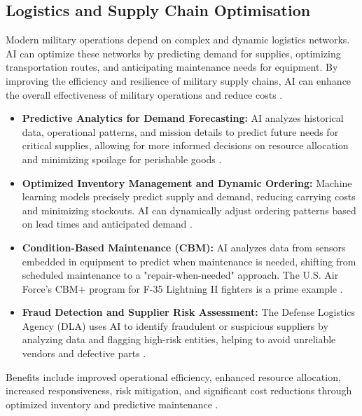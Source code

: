 \subsection{Logistics and Supply Chain Optimisation}
Modern military operations depend on complex and dynamic logistics networks. AI can optimize these networks by predicting demand for supplies, optimizing transportation routes, and anticipating maintenance needs for equipment. By improving the efficiency and resilience of military supply chains, AI can enhance the overall effectiveness of military operations and reduce costs \cite{sayler2020artificial}.
\begin{itemize}
    \item \textbf{Predictive Analytics for Demand Forecasting:} AI analyzes historical data, operational patterns, and mission details to predict future needs for critical supplies, allowing for more informed decisions on resource allocation and minimizing spoilage for perishable goods \cite{Medium_Logistics, TagUp_Logistics}.
    \item \textbf{Optimized Inventory Management and Dynamic Ordering:} Machine learning models precisely predict supply and demand, reducing carrying costs and minimizing stockouts. AI can dynamically adjust ordering patterns based on lead times and anticipated demand \cite{TagUp_Logistics}.
    \item \textbf{Condition-Based Maintenance (CBM):} AI analyzes data from sensors embedded in equipment to predict when maintenance is needed, shifting from scheduled maintenance to a "repair-when-needed" approach. The U.S. Air Force's CBM+ program for F-35 Lightning II fighters is a prime example \cite{DisruptionHub_Logistics}.
    \item \textbf{Fraud Detection and Supplier Risk Assessment:} The Defense Logistics Agency (DLA) uses AI to identify fraudulent or suspicious suppliers by analyzing data and flagging high-risk entities, helping to avoid unreliable vendors and defective parts \cite{DLA_Logistics}.
\end{itemize}
Benefits include improved operational efficiency, enhanced resource allocation, increased responsiveness, risk mitigation, and significant cost reductions through optimized inventory and predictive maintenance \cite{DefenseCoop_Logistics, Avathon_Logistics}.

